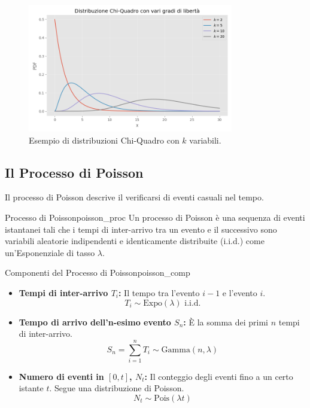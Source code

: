 \begin{figure}[H]
    \centering
    \includegraphics[width=0.8\textwidth]{images/chi2.png}
    \caption{Esempio di distribuzioni Chi-Quadro con \(k\) variabili.}
    \label{fig:chi2}
\end{figure}

\subsection{Il Processo di Poisson}
Il processo di Poisson descrive il verificarsi di eventi casuali nel tempo.

\begin{definizione}{Processo di Poisson}{poisson_proc}
Un processo di Poisson è una sequenza di eventi istantanei tali che i tempi di inter-arrivo tra un evento e il successivo sono variabili aleatorie indipendenti e identicamente distribuite (i.i.d.) come un'Esponenziale di tasso \(\lambda\).
\end{definizione}

\begin{proposizione}{Componenti del Processo di Poisson}{poisson_comp}
\begin{itemize}
    \item \textbf{Tempi di inter-arrivo \(T_i\):} Il tempo tra l'evento \(i-1\) e l'evento \(i\).
    \[ T_i \sim \text{Expo}(\lambda) \text{ i.i.d.} \]
    \item \textbf{Tempo di arrivo dell'n-esimo evento \(S_n\):} È la somma dei primi \(n\) tempi di inter-arrivo.
    \[ S_n = \sum_{i=1}^n T_i \sim \text{Gamma}(n, \lambda) \]
    \item \textbf{Numero di eventi in \([0, t]\), \(N_t\):} Il conteggio degli eventi fino a un certo istante \(t\). Segue una distribuzione di Poisson.
    \[ N_t \sim \text{Pois}(\lambda t) \]
\end{itemize}
\end{proposizione}

